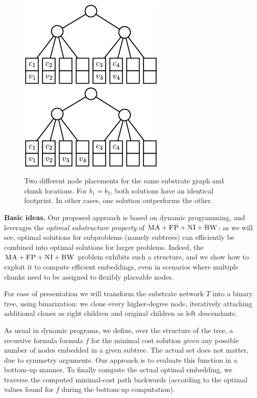 \documentclass[preprint,12pt]{elsarticle}
\newcommand{\CC}{\textsc{NI}}
\newcommand{\FP}{\textsc{FP}}
\newcommand{\BW}{\textsc{BW}}
\newcommand{\MA}{\textsc{MA}}
\newcommand{\Tree}{\ensuremath{T}}
\newcommand{\CostTrans}{\ensuremath{b_1}}
\newcommand{\CostCom}{\ensuremath{b_2}}
\begin{document}
\begin{figure}
\includegraphics[width = 0.49\columnwidth]{figs/dynamic_bad}
\hfill
\includegraphics[width = 0.49\columnwidth]{figs/dynamic_good}
\caption{Two different node placements for the same substrate graph and chunk
locations. For $\CostTrans = \CostCom$, both solutions have an identical
footprint. In other cases, one solution outperforms the other.}
\label{fig:dynamic_motivation}
\vspace{-1em}
\end{figure}



\textbf{Basic ideas.} Our proposed approach is based on dynamic programming, and
leverages the \emph{optimal substructure property} of $\MA+\FP+\CC+\BW$:
as we will see, optimal solutions for subproblems (namely subtrees)
can efficiently be combined into optimal solutions for larger problems.
Indeed, the $\MA+\FP+\CC+\BW$ problem
exhibits such a structure, and we show how to exploit it to
compute efficient embeddings, even in scenarios where multiple chunks
need to be assigned to flexibly placeable nodes.

For ease of presentation we will transform the
substrate network $\Tree$
into a binary tree, using binarization:
we clone every higher-degree node,
iteratively attaching additional clones as right children
and original children as left descendants.

As usual in dynamic programs, we define, over the structure of the tree, a
recursive formula formula $f$ for
the minimal cost solution \emph{given} any possible number of nodes
embedded in a given subtree. The actual set does not matter,
due to symmetry arguments.
Our approach is to evaluate this function in a bottom-up
manner.
To finally compute the actual optimal embedding,
we traverse the computed minimal-cost path backwards
(according to
the optimal values found for $f$ during the bottom-up computation).
\end{document}

